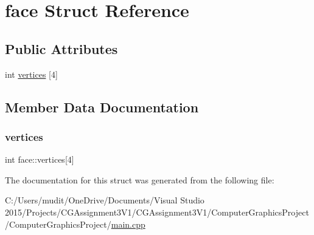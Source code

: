 \hypertarget{structface}{}\section{face Struct Reference}
\label{structface}
\subsection*{Public Attributes}
\begin{DoxyCompactItemize}
\item 
int \hyperlink{structface_ac5029780a2b79ac14a56ec9badd7ebd7}{vertices} \mbox{[}4\mbox{]}
\end{DoxyCompactItemize}


\subsection{Member Data Documentation}
\hypertarget{structface_ac5029780a2b79ac14a56ec9badd7ebd7}{}\label{structface_ac5029780a2b79ac14a56ec9badd7ebd7} 
\subsubsection{\texorpdfstring{vertices}{vertices}}
{\footnotesize\ttfamily int face\+::vertices\mbox{[}4\mbox{]}}



The documentation for this struct was generated from the following file\+:\begin{DoxyCompactItemize}
\item 
C\+:/\+Users/mudit/\+One\+Drive/\+Documents/\+Visual Studio 2015/\+Projects/\+C\+G\+Assignment3\+V1/\+C\+G\+Assignment3\+V1/\+Computer\+Graphics\+Project/\+Computer\+Graphics\+Project/\hyperlink{main_8cpp}{main.\+cpp}\end{DoxyCompactItemize}
